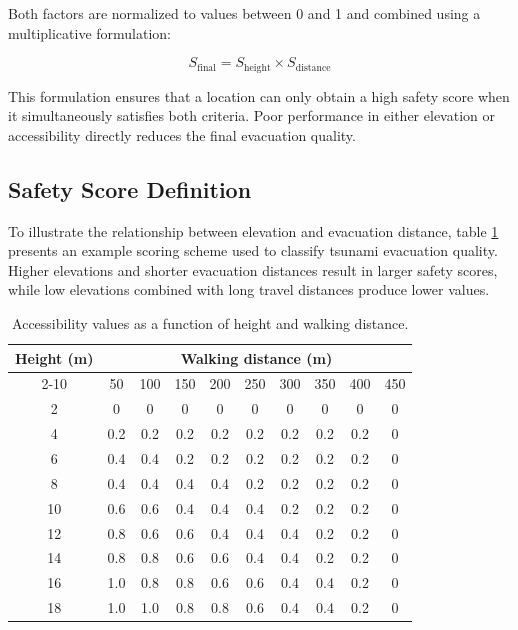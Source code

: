 Both factors are normalized to values between 0 and 1 and combined using a multiplicative formulation:

\begin{equation}
S_{\mathrm{final}} = S_{\mathrm{height}} \times S_{\mathrm{distance}}
\end{equation}

This formulation ensures that a location can only obtain a high safety score when it simultaneously satisfies both criteria. Poor performance in either elevation or accessibility directly reduces the final evacuation quality.

\subsection{Safety Score Definition}

To illustrate the relationship between elevation and evacuation distance, table \ref{tab:tsunami_score} presents an example scoring scheme used to classify tsunami evacuation quality. Higher elevations and shorter evacuation distances result in larger safety scores, while low elevations combined with long travel distances produce lower values.

\begin{table}[htbp]
    \centering
    \caption{Accessibility values as a function of height and walking distance.}
    \label{tab:tsunami_score}

    \setlength{\tabcolsep}{6pt} %
    \renewcommand{\arraystretch}{1.2} %

    \begin{tabular}{c| ccccccccc}
        \hline
        Height (m) & \multicolumn{9}{c}{Walking distance (m)} \\
        \cline{2-10}
        & 50 & 100 & 150 & 200 & 250 & 300 & 350 & 400 & 450 \\
        \hline
        2  & 0   & 0   & 0   & 0   & 0   & 0   & 0   & 0   & 0 \\
        4  & 0.2 & 0.2 & 0.2 & 0.2 & 0.2 & 0.2 & 0.2 & 0.2 & 0 \\
        6  & 0.4 & 0.4 & 0.2 & 0.2 & 0.2 & 0.2 & 0.2 & 0.2 & 0 \\
        8  & 0.4 & 0.4 & 0.4 & 0.4 & 0.2 & 0.2 & 0.2 & 0.2 & 0 \\
        10 & 0.6 & 0.6 & 0.4 & 0.4 & 0.4 & 0.2 & 0.2 & 0.2 & 0 \\
        12 & 0.8 & 0.6 & 0.6 & 0.4 & 0.4 & 0.4 & 0.2 & 0.2 & 0 \\
        14 & 0.8 & 0.8 & 0.6 & 0.6 & 0.4 & 0.4 & 0.2 & 0.2 & 0 \\
        16 & 1.0 & 0.8 & 0.8 & 0.6 & 0.6 & 0.4 & 0.4 & 0.2 & 0 \\
        18 & 1.0 & 1.0 & 0.8 & 0.8 & 0.6 & 0.4 & 0.4 & 0.2 & 0 \\
        \hline
    \end{tabular}
\end{table}


